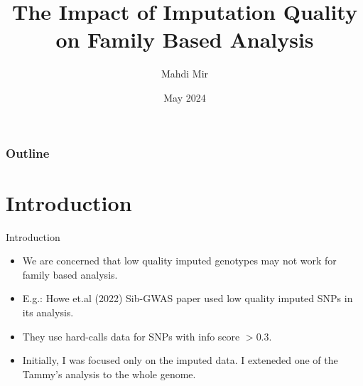 \documentclass{beamer}
\title{The Impact of Imputation Quality \\ on Family Based Analysis}
\author[]{Mahdi Mir}
\date[]{May 2024}
\begin{document}
\maketitle


\begin{frame}[label=outl]
    \frametitle{Outline}
    \tableofcontents{}
\end{frame}


\section{Introduction}


\begin{frame}{Introduction}


\begin{itemize}
      \item We are concerned that low quality imputed genotypes may not work for family based analysis.
      \item E.g.: Howe et.al (2022) Sib-GWAS paper used low quality imputed SNPs in its analysis. %
      \item They use hard-calls data for SNPs with info score \(> 0.3\).
      \item Initially, I was focused only on the imputed data. I exteneded one of the Tammy's analysis to the whole genome.
\end{itemize}

    
\end{frame}
\end{document}
